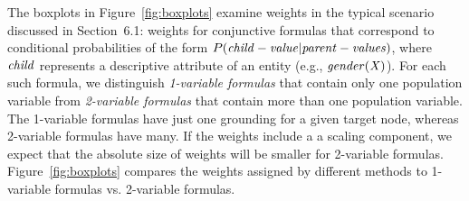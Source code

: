 \documentclass[twoside,leqno,twocolumn]{article}
\begin{document}
%
%
%
%

The boxplots in Figure~\ref{fig:boxplots} examine weights in the typical scenario discussed in Section~6.1: weights for conjunctive formulas that correspond to conditional probabilities of the form $P(\it{child-value}|\it{parent-values})$, where $\it{child}$ represents a descriptive attribute of an entity (e.g., $\it{gender}(X)$). For each such formula, we distinguish {\em 1-variable formulas} that contain only one population variable %
from {\em 2-variable formulas} that contain more than one population variable.
The 1-variable formulas have just one grounding for a given target node, whereas 2-variable formulas have many. If the weights include a a scaling component, we expect that the absolute size of weights will be smaller for 2-variable formulas.  Figure~\ref{fig:boxplots} compares the weights assigned by different methods to 1-variable formulas vs. 2-variable formulas.
\end{document}
